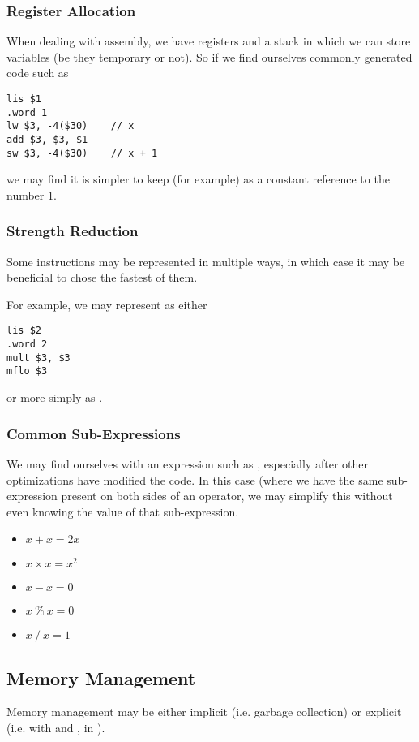 \documentclass[12pt]{article}
\begin{document}
\subsubsection*{Register Allocation}
When dealing with assembly, we have registers and a stack in which we can store variables (be they temporary or not). So if we find ourselves commonly generated code such as
\begin{verbatim}
lis $1
.word 1
lw $3, -4($30)    // x
add $3, $3, $1
sw $3, -4($30)    // x + 1
\end{verbatim}
we may find it is simpler to keep  (for example) as a constant reference to the number $1$.

\subsubsection*{Strength Reduction}
Some instructions may be represented in multiple ways, in which case it may be beneficial to chose the fastest of them.

For example, we may represent  as either
\begin{verbatim}
lis $2
.word 2
mult $3, $3
mflo $3
\end{verbatim}
or more simply as .

\subsubsection*{Common Sub-Expressions}
We may find ourselves with an expression such as , especially after other optimizations have modified the code. In this case (where we have the same sub-expression present on both sides of an operator, we may simplify this without even knowing the value of that sub-expression.

\begin{itemize}
\item $x + x = 2x$
\item $x \times x = x^2$
\item $x - x = 0$
\item $x\ \%\ x = 0$
\item $x\ /\ x = 1$
\end{itemize}

\subsection*{Memory Management}
Memory management may be either implicit (i.e. garbage collection) or explicit (i.e. with  and , in ).
\end{document}
